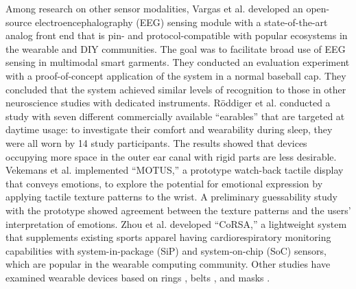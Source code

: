 \documentclass[sigchi,authordraft]{acmart}
\begin{document}
Among research on other sensor modalities, Vargas et al. \cite{Brainwear} developed an open-source electroencephalography (EEG) sensing module with a state-of-the-art analog front end that is pin- and protocol-compatible with popular ecosystems in the wearable and DIY communities. The goal was to facilitate broad use of EEG sensing in multimodal smart garments. They conducted an evaluation experiment with a proof-of-concept application of the system in a normal baseball cap. They concluded that the system achieved similar levels of recognition to those in other neuroscience studies with dedicated instruments. R\"{o}ddiger et al. \cite{earables} conducted a study with seven different commercially available ``earables'' that are targeted at daytime usage: to investigate their comfort and wearability during sleep, they were all worn by 14 study participants. The results showed that devices occupying more space in the outer ear canal with rigid parts are less desirable. Vekemans et al. \cite{MOTUS} implemented ``MOTUS,'' a prototype watch-back tactile display that conveys emotions, to explore the potential for emotional expression by applying tactile texture patterns to the wrist. A preliminary guessability study with the prototype showed agreement between the texture patterns and the users' interpretation of emotions. Zhou et al. \cite{CoRSA} developed ``CoRSA,'' a lightweight system that supplements existing sports apparel having cardiorespiratory monitoring capabilities with system-in-package (SiP) and system-on-chip (SoC) sensors, which are popular in the wearable computing community. Other studies have examined wearable devices based on rings \cite{wearable_ring1, wearable_ring2, TypingRing, ElectroRing}, belts \cite{wearable_belt1, SmartBelt, WaistonBeltX, wearable_belt2}, and masks \cite{wearable_mask1, wearable_mask2, SilentMask, Masquare}.\par
\end{document}
